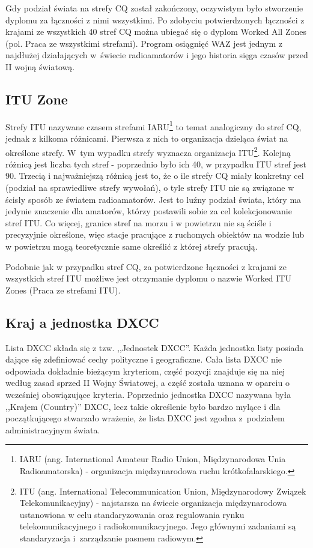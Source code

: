 \documentclass[]{mgr}
\begin{document}
            Gdy podział świata na strefy CQ został zakończony, oczywistym było stworzenie dyplomu za łączności z nimi wszystkimi. Po zdobyciu potwierdzonych łączności z krajami ze wszystkich 40 stref CQ można ubiegać się o dyplom Worked All Zones (pol. Praca ze wszystkimi strefami). Program osiągnięć WAZ jest jednym z najdłużej działających w~świecie radioamatorów i jego historia sięga czasów przed II wojną światową.

            \subsection{ITU Zone}
            Strefy ITU nazywane czasem strefami IARU\footnote{IARU (ang. International Amateur Radio Union, Międzynarodowa Unia Radioamatorska) - organizacja międzynarodowa ruchu krótkofalarskiego.} to temat analogiczny do stref CQ, jednak z kilkoma różnicami. Pierwsza z nich to organizacja dzieląca świat na określone strefy. W~tym wypadku strefy wyznacza organizacja ITU\footnote{ITU (ang. International Telecommunication Union, Międzynarodowy Związek Telekomunikacyjny) - najstarsza na świecie organizacja międzynarodowa ustanowiona w celu standaryzowania oraz regulowania rynku telekomunikacyjnego i radiokomunikacyjnego. Jego głównymi zadaniami są standaryzacja i~zarządzanie pasmem radiowym.}. Kolejną różnicą jest liczba tych stref - poprzednio było ich 40, w przypadku ITU stref jest 90. Trzecią i najważniejszą różnicą jest to, że o ile strefy CQ miały konkretny cel (podział na sprawiedliwe strefy wywołań), o tyle strefy ITU nie są związane w ścisły sposób ze światem radioamatorów. Jest to luźny podział świata, który ma jedynie znaczenie dla amatorów, którzy postawili sobie za cel kolekcjonowanie stref ITU. Co więcej, granice stref na morzu i w powietrzu nie są ściśle i precyzyjnie określone, więc stacje pracujące z ruchomych obiektów na wodzie lub w powietrzu mogą teoretycznie same określić z której strefy pracują.

            Podobnie jak w przypadku stref CQ, za potwierdzone łączności z krajami ze wszystkich stref ITU możliwe jest otrzymanie dyplomu o nazwie Worked ITU Zones (Praca ze strefami ITU).

            \subsection{Kraj a jednostka DXCC}
            Lista DXCC składa się z tzw. ,,Jednostek DXCC''. Każda jednostka listy posiada dające się zdefiniować cechy polityczne i geograficzne. Cała lista DXCC nie odpowiada dokładnie bieżącym kryteriom, część pozycji znajduje się na niej według zasad sprzed II Wojny Światowej, a część została uznana w oparciu o wcześniej obowiązujące kryteria. Poprzednio jednostka DXCC nazywana była ,,Krajem (Country)'' DXCC, lecz takie określenie było bardzo mylące i dla początkującego stwarzało wrażenie, że lista DXCC jest zgodna z~podziałem administracyjnym świata.
\end{document}
